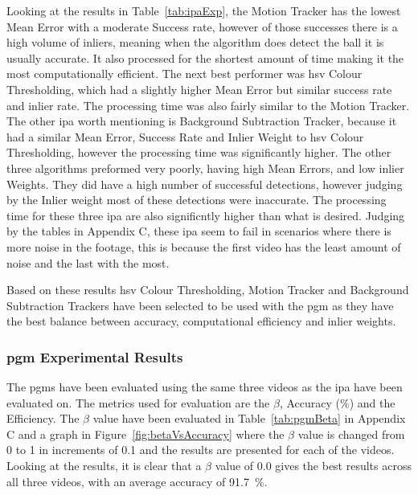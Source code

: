 \documentclass[12pt,a4paper]{article}
\begin{document}
Looking at the results in Table~\ref{tab:ipaExp}, the Motion Tracker has the lowest Mean Error with a moderate Success rate, however of those successes there is a high volume of inliers, meaning when the algorithm does detect the ball it is usually accurate. It also processed for the shortest amount of time making it the most computationally efficient. The next best performer was \acs{hsv} Colour Thresholding, which had a slightly higher Mean Error but similar success rate and inlier rate. The processing time was also fairly similar to the Motion Tracker. The other \acs{ipa} worth mentioning is Background Subtraction Tracker, because it had a similar Mean Error, Success Rate and Inlier Weight to \acs{hsv} Colour Thresholding, however the processing time was significantly higher. The other three algorithms preformed very poorly, having high Mean Errors, and low inlier Weights. They did have a high number of successful detections, however judging by the Inlier weight most of these detections were inaccurate. The processing time for these three \acs{ipa} are also significntly higher than what is desired. Judging by the tables in Appendix C, these \acs{ipa} seem to fail in scenarios where there is more noise in the footage, this is because the first video has the least amount of noise and the last with the most.

Based on these results \acs{hsv} Colour Thresholding, Motion Tracker and Background Subtraction Trackers have been selected to be used with the \acs{pgm} as they have the best balance between accuracy, computational efficiency and inlier weights.

\subsubsection{\acs{pgm} Experimental Results}
The \acs{pgm}s have been evaluated using the same three videos as the \acs{ipa} have been evaluated on. The metrics used for evaluation are the $\beta$, Accuracy (\%) and the Efficiency. The $\beta$ value have been evaluated in Table~\ref{tab:pgmBeta} in Appendix C and a graph in Figure~\ref{fig:betaVsAccuracy} where the $\beta$ value is changed from 0 to 1 in increments of 0.1 and the results are presented for each of the videos. Looking at the results, it is clear that a $\beta$ value of 0.0 gives the best results across all three videos, with an average accuracy of 91.7~$\%$. 
\end{document}
